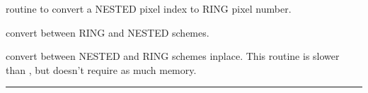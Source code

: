 \begin{modules}
  \begin{sulist}{} %
 \item[\htmlref{nest2ring}{sub:pix_tools}] routine to convert a NESTED pixel index to RING pixel number.		
  \end{sulist}
\end{modules}
\begin{related}
  \begin{sulist}{} %
  \item[\htmlref{convert\_ring2nest}{sub:convert_ring2nest}] convert between RING and NESTED schemes.
  \item[\htmlref{convert\_inplace}{sub:convert_inplace}] convert between NESTED
    and RING schemes inplace. This routine is slower than \thedocid, but doesn't require as much memory.
  \end{sulist}
\end{related}

\rule{\hsize}{2mm}

\newpage
